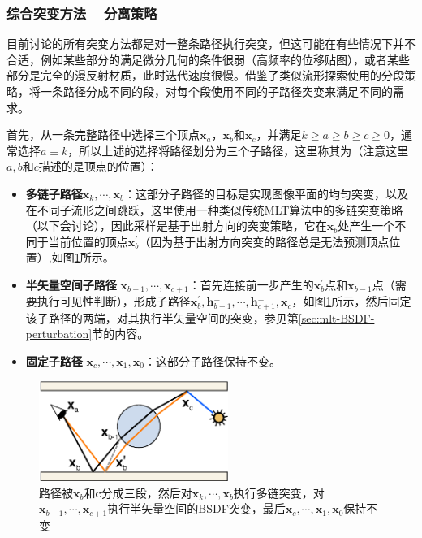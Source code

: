 \subsubsection{综合突变方法 -- 分离策略}
目前讨论的所有突变方法都是对一整条路径执行突变，但这可能在有些情况下并不合适，例如某些部分的满足微分几何的条件很弱（高频率的位移贴图），或者某些部分是完全的漫反射材质，此时迭代速度很慢。\cite{a:ImprovedHalfVectorSpaceLightTransport}借鉴了类似流形探索使用的分段策略，将一条路径分成不同的段，对每个段使用不同的子路径突变来满足不同的需求。

首先，从一条完整路径中选择三个顶点$\mathbf{x}_a$，$\mathbf{x}_b$和$\mathbf{x}_c$，并满足$k\geq a\geq b\geq c\geq 0$，通常选择$a\equiv k$，所以上述的选择将路径划分为三个子路径，这里称其为（注意这里$a,b$和$c$描述的是顶点的位置）：

\begin{itemize}
	\item \textbf{多链子路径}$\mathbf{x}_k,\cdots,\mathbf{x}_b$：这部分子路径的目标是实现图像平面的均匀突变，以及在不同子流形之间跳跃，这里使用一种类似传统MLT算法中的多链突变策略（以下会讨论），因此采样是基于出射方向的突变策略，它在$\mathbf{x}_b$处产生一个不同于当前位置的顶点$\mathbf{x}^{'}_b$（因为基于出射方向突变的路径总是无法预测顶点位置）,如图\ref{f:mlt-breakup}所示。
	\item \textbf{半矢量空间子路径 }$\mathbf{x}_{b-1},\cdots,\mathbf{x}_{c+1}$：首先连接前一步产生的$\mathbf{x}^{'}_b$点和$\mathbf{x}_{b-1}$点（需要执行可见性判断），形成子路径$\mathbf{x}^{'}_b,\mathbf{h}^{\perp}_{b-1},\cdots,\mathbf{h}^{\perp}_{c+1},\mathbf{x}_c$，如图\ref{f:mlt-breakup}所示，然后固定该子路径的两端，对其执行半矢量空间的突变，参见第\ref{sec:mlt-BSDF-perturbation}节的内容。
	\item \textbf{固定子路径 }$\mathbf{x}_c,\cdots,\mathbf{x}_1,\mathbf{x}_0$：这部分子路径保持不变。
\end{itemize}

\begin{figure}
	\sidecaption
	\includegraphics[width=0.55\textwidth]{figures/mlt/breakup}
	\caption{路径被$\mathbf{x}_b$和$\mathbf{c}$分成三段，然后对$\mathbf{x}_k,\cdots,\mathbf{x}_b$执行多链突变，对$\mathbf{x}_{b-1},\cdots,\mathbf{x}_{c+1}$执行半矢量空间的BSDF突变，最后$\mathbf{x}_c,\cdots,\mathbf{x}_1,\mathbf{x}_0$保持不变}
	\label{f:mlt-breakup}
\end{figure}


